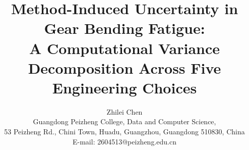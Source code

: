 \documentclass[12pt,a4paper]{article}
\begin{document}
\title{\textbf{Method-Induced Uncertainty in Gear Bending Fatigue:\\
A Computational Variance Decomposition Across Five Engineering Choices}}

\author{Zhilei Chen\\
Guangdong Peizheng College, Data and Computer Science,\\
53 Peizheng Rd., Chini Town, Huadu, Guangzhou, Guangdong 510830, China\\
E-mail: 2604513@peizheng.edu.cn}

\maketitle

\end{document}
